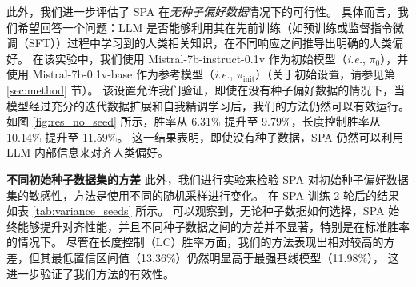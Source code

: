 此外，我们进一步评估了 SPA 在\textit{无种子偏好数据}情况下的可行性。
具体而言，我们希望回答一个问题：LLM 是否能够利用其在先前训练（如预训练或监督指令微调（SFT））过程中学习到的人类相关知识，在不同响应之间推导出明确的人类偏好。
在该实验中，我们使用 Mistral-7b-instruct-0.1v \citep{jiang2023mistral} 作为初始模型（\textit{i.e.}, $\pi_0$），并使用 Mistral-7b-0.1v-base 作为参考模型（\textit{i.e.}, $\pi_{\text{init}}$）（关于初始设置，请参见第 \ref{sec:method} 节）。
该设置允许我们验证，即使在没有种子偏好数据的情况下，当模型经过充分的迭代数据扩展和自我精调学习后，我们的方法仍然可以有效运行。
如图 \ref{fig:res_no_seed} 所示，胜率从 6.31\% 提升至 9.79\%，长度控制胜率从 10.14\% 提升至 11.59\%。
这一结果表明，即使没有种子数据，SPA 仍然可以利用 LLM 内部信息来对齐人类偏好。

\begin{table}[t]
    \centering
    \caption{\textbf{不同的初始种子。} 在 AlpacaEval 2.0 上，针对不同初始种子偏好数据采样，对 Mistral-7B-v0.1 的不同变体进行评估。}
    \label{tab:variance_seeds}
\end{table}

\textbf{不同初始种子数据集的方差} 
此外，我们进行实验来检验 SPA 对初始种子偏好数据集的敏感性，方法是使用不同的随机采样进行变化。
在 SPA 训练 2 轮后的结果如表 \ref{tab:variance_seeds} 所示。
可以观察到，无论种子数据如何选择，SPA 始终能够提升对齐性能，并且不同种子数据之间的方差并不显著，特别是在标准胜率的情况下。
尽管在长度控制（LC）胜率方面，我们的方法表现出相对较高的方差，但其最低置信区间值（13.36\%）仍然明显高于最强基线模型（11.98\%），
这进一步验证了我们方法的有效性。

